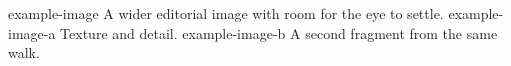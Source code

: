 \documentclass{travelbook}
\begin{document}
\clearpage

\threephotos
  {example-image}
  {A wider editorial image with room for the eye to settle.}
  {example-image-a}
  {Texture and detail.}
  {example-image-b}
  {A second fragment from the same walk.}


\end{document}
